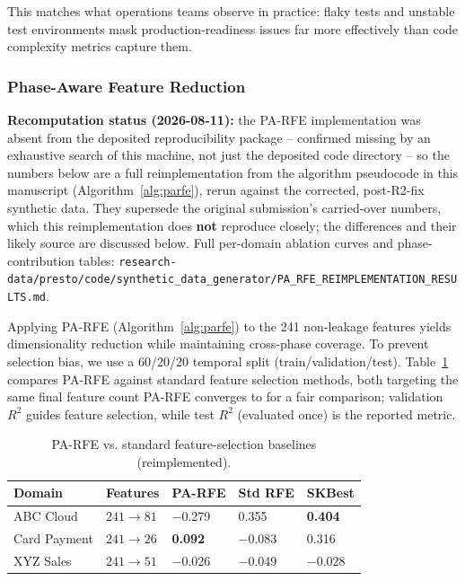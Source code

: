 \documentclass[technologies,article,submit,pdftex,moreauthors]{Definitions/mdpi}
\begin{document}
This matches what operations teams observe in practice: flaky tests and
unstable test environments mask production-readiness issues far more
effectively than code complexity metrics capture them.

\subsubsection{Phase-Aware Feature Reduction}\label{sec:parfe_results}

\textbf{Recomputation status (2026-08-11):} the PA-RFE implementation
was absent from the deposited reproducibility package -- confirmed
missing by an exhaustive search of this machine, not just the deposited
code directory -- so the numbers below
are a full reimplementation from the algorithm pseudocode in this
manuscript (Algorithm~\ref{alg:parfe}), rerun
against the corrected, post-R2-fix synthetic data. They supersede the
original submission's carried-over numbers, which this reimplementation
does \textbf{not} reproduce closely; the differences and their likely
source are discussed below. Full per-domain ablation curves and
phase-contribution tables:
\texttt{research-data/\allowbreak presto/\allowbreak code/\allowbreak synthetic\_\allowbreak data\_\allowbreak generator/\allowbreak PA\_\allowbreak RFE\_\allowbreak REIMPLEMENTATION\_\allowbreak RESULTS.md}.

Applying PA-RFE (Algorithm~\ref{alg:parfe}) to the
241 non-leakage features yields dimensionality reduction while
maintaining cross-phase coverage. To prevent selection bias, we use a
60/20/20 temporal split (train/validation/test).
Table~\ref{tab:parfe_comparison} compares PA-RFE against standard
feature selection methods, both targeting the same final feature count
PA-RFE converges to for a fair comparison; validation \(R^2\) guides
feature selection, while test \(R^2\) (evaluated once) is the reported
metric.

{\def\LTcaptype{none} %
\begin{table}[H]
\centering
\caption{PA-RFE vs. standard feature-selection baselines (reimplemented).\label{tab:parfe_comparison}}
\begin{tabular}{@{}lllll@{}}
\toprule
\textbf{Domain} & \textbf{Features} & \textbf{PA-RFE} & \textbf{Std RFE}
& \textbf{SKBest} \\
\midrule
ABC Cloud & \(241\rightarrow 81\) & \(-\)0.279 & 0.355 &
\textbf{0.404} \\
Card Payment & \(241\rightarrow 26\) & \textbf{0.092} & \(-\)0.083 &
0.316 \\
XYZ Sales & \(241\rightarrow 51\) & \(-\)0.026 & \(-\)0.049 &
\(-\)0.028 \\
\bottomrule
\end{tabular}
\end{table}
}
\end{document}
